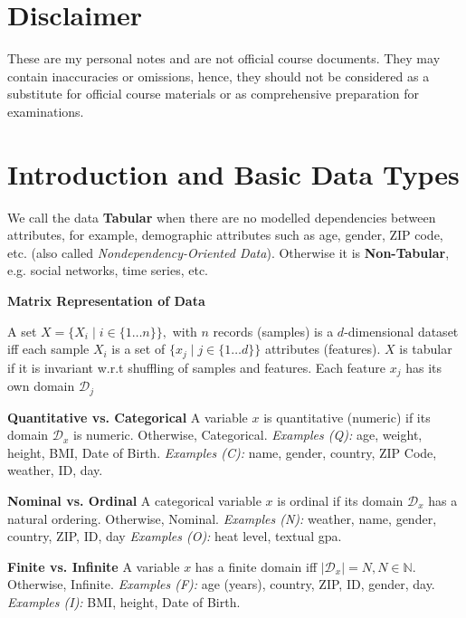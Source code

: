 \documentclass{article}
\begin{document}
\maketitle
\section*{Disclaimer}

These are my personal notes and are not official course documents. They may contain inaccuracies or omissions, hence, they should not be considered as a substitute for official course materials or as comprehensive preparation for examinations.

\section*{Introduction and Basic Data Types}
We call the data \textbf{Tabular} when there are no modelled dependencies between attributes, for example, demographic attributes such as age, gender, ZIP code, etc. (also called \textit{Nondependency-Oriented Data}). Otherwise it is \textbf{Non-Tabular}, e.g. social networks, time series, etc.

\textbf{Matrix Representation of Data}

A set  $X = \{ X_i \mid  i \in \{1 \dots n \}\}, $ with $n$ records (samples) is a $d$-dimensional dataset iff each sample $X_i$ is a set of $\{ x_j \mid j \in \{ 1 \dots d\} \}$ attributes (features). $X$ is tabular if it is invariant w.r.t shuffling of samples and features. Each feature $x_j$ has its own domain $\mathcal{D}_j$

\textbf{Quantitative vs. Categorical}
A variable $x$ is quantitative (numeric) if its domain $\mathcal{D}_x$ is numeric. Otherwise, Categorical.
\textit{Examples (Q): }age, weight, height, BMI, Date of Birth.
\textit{Examples (C): }name, gender, country, ZIP Code, weather, ID, day.

\textbf{Nominal vs. Ordinal}
A categorical variable $x$ is ordinal if its domain $\mathcal{D}_x$ has a natural ordering. Otherwise, Nominal.
\textit{Examples (N): }weather, name, gender, country, ZIP, ID, day
\textit{Examples (O): }heat level, textual gpa.

\textbf{Finite vs. Infinite}
A variable $x$ has a finite domain iff $|\mathcal{D}_x| = N , N \in \mathbb{N}$. Otherwise, Infinite.
\textit{Examples (F): }age (years), country, ZIP, ID, gender, day.
\textit{Examples (I): }BMI, height, Date of Birth.
\end{document}
